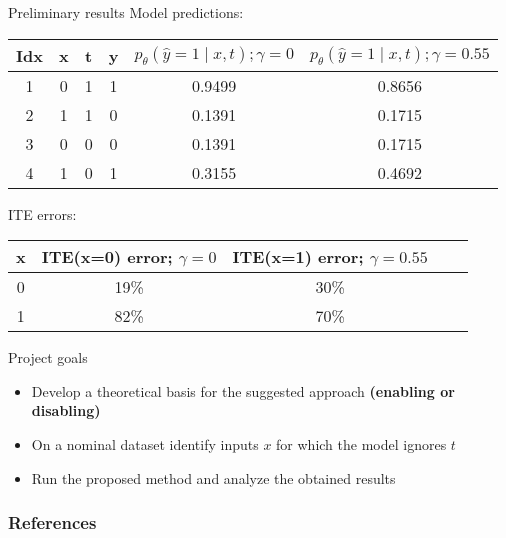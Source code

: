 \documentclass{beamer}
\begin{document}
\begin{frame}{Preliminary results}
Model predictions:
    \begin{center}
     \begin{tabular}{||c | c | c | c | c | c ||}
     \hline
     Idx & x & t & y & $p_\theta(\hat{y}=1 \mid x,t); \gamma=0$ & $p_\theta(\hat{y}=1 \mid x,t); \gamma=0.55$ \\ [0.5ex] 
     \hline\hline
     1 & 0 & 1 & 1 & 0.9499 & 0.8656 \\ 
     \hline
     2 & 1 & 1 & 0 & 0.1391 & 0.1715 \\
     \hline
     3 & 0 & 0 & 0 & 0.1391 & 0.1715 \\
     \hline
     4 & 1 & 0 & 1 & 0.3155 & 0.4692 \\ [1ex] 
     \hline
    \end{tabular}
    \end{center}
ITE errors:
    \begin{center}
     \begin{tabular}{||c | c | c | c | c ||}
     \hline
     x & ITE(x=0) error; $\gamma=0$ & ITE(x=1) error; $\gamma=0.55$ \\ [0.5ex] 
     \hline\hline
     0 & 19\% & 30\% \\ 
     \hline
     1 & 82\% & 70\% \\ [1ex] 
     \hline
    \end{tabular}
    \end{center}
\end{frame}
\begin{frame}{Project goals}
    \begin{itemize}
        \item Develop a theoretical basis for the suggested approach \textbf{(enabling or disabling)}
        \item On a nominal dataset identify inputs $x$ for which the model ignores $t$
        \item Run the proposed method and analyze the obtained results
    \end{itemize}
\end{frame}
\begin{frame}[t,allowframebreaks]
\frametitle{References}


\end{frame}
\end{document}
